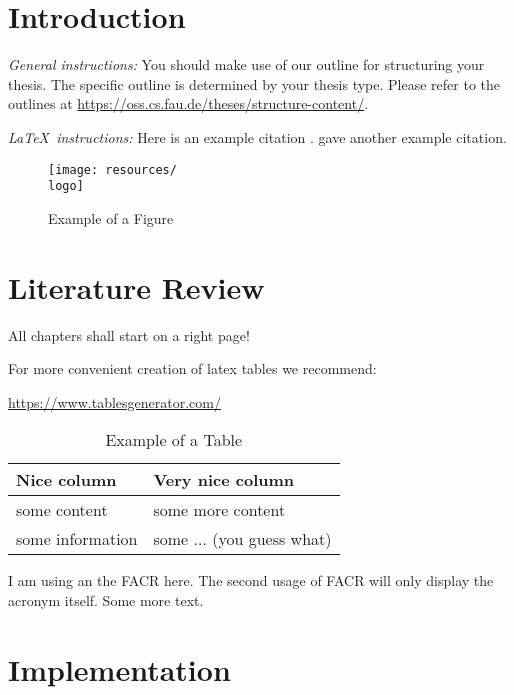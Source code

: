 \chapter{Introduction}
\label{chapter:Introduction}

{\textsl{General instructions:}}
You should make use of our outline for structuring your
thesis. The specific outline is determined by your thesis type.
Please refer to the outlines at
\url{https://oss.cs.fau.de/theses/structure-content/}.

{\textsl{\LaTeX\ instructions:}} Here is an example citation
\autocite{riehle:2011:controlling}.
\textcite{riehle:2007:economic} gave another example citation.

\begin{figure}[ht]
	\texttt{[image: resources/\\logo]}
	\caption{Example of a Figure}
	\label{fig:example}
\end{figure}

\chapter{Literature Review}
\label{chapter:Literature}

All chapters shall start on a right page!

For more convenient creation of latex tables we recommend:

\url{https://www.tablesgenerator.com/}

\begin{table}[ht]
	\caption{Example of a Table}
	\label{tab:example}
	\begin{tabular}{|l|l|}
		\hline
		Nice column      & Very nice column          \\
		\hline
		some content     & some more content         \\
		some information & some ... (you guess what) \\
		\hline
	\end{tabular}
\end{table}

I am using an the \ac{FACR} here. The second usage of \ac{FACR} will only display the acronym itself.
\newpage
Some more text.



\chapter{Implementation}
\label{chapter:Implementation}

